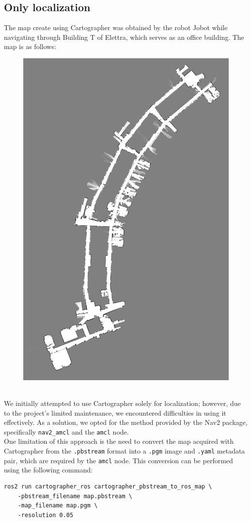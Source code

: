 \subsection{Only localization}
\alert{The map create using Cartographer was obtained by the robot Jobot while navigating through Building T of Elettra, which serves as an office building. The map is as follows:} \\
\begin{figure}[h]
	\centering
	\includegraphics[width=0.4\linewidth]{img/map.png}
\end{figure}\\
We initially attempted to use Cartographer solely for localization; however, due to the project’s limited maintenance, we encountered difficulties in using it effectively. As a solution, we opted for the method provided by the Nav2 package, specifically  \texttt{nav2\_amcl} and the \texttt{amcl} node.\\
One limitation of this approach is the need to convert the map acquired with Cartographer from the \texttt{.pbstream} format into a \texttt{.pgm} image and \texttt{.yaml} metadata pair, which are required by the \texttt{amcl} node. This conversion can be performed using the following command:\\
\begin{listing} [ht!]
\begin{verbatim} 
ros2 run cartographer_ros cartographer_pbstream_to_ros_map \
	-pbstream_filename map.pbstream \
	-map_filename map.pgm \
	-resolution 0.05
\end{verbatim}
\end{listing}\\
